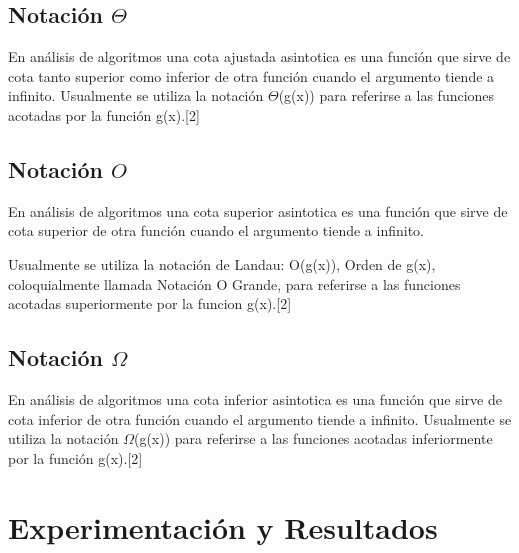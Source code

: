 \documentclass[12pt,twoside]{article}
\begin{document}
\subsection*{Notación $\Theta$}
En análisis de algoritmos una cota ajustada asintotica es una función que sirve de cota tanto superior como inferior de otra función cuando el argumento tiende a infinito. Usualmente se utiliza la notación $\Theta$(g(x)) para referirse a las
funciones acotadas por la función g(x).[2]


\subsection*{Notación $O$}
En análisis de algoritmos una cota superior asintotica es una función que sirve de cota superior de otra función cuando el argumento tiende a infinito.

Usualmente se utiliza la notación de Landau: O(g(x)), Orden de g(x), coloquialmente llamada Notación O Grande, para referirse a las funciones acotadas superiormente por la funcion g(x).[2]

\subsection*{Notación $\Omega$}
En análisis de algoritmos una cota inferior asintotica es una función que sirve de cota inferior de otra función cuando el argumento tiende a infinito.
Usualmente se utiliza la notación $\Omega$(g(x)) para referirse a las funciones acotadas inferiormente por la función g(x).[2]

\vspace{100 mm}
\section{Experimentación y Resultados}
\end{document}
